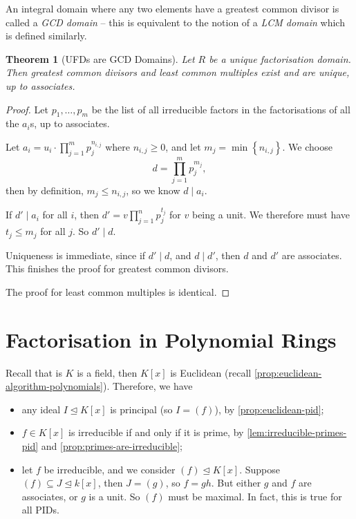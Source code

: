 \documentclass{article}
\newtheorem{theorem}{Theorem}[section]
\theoremstyle{definition}
\theoremstyle{remark}
\newcommand{\pqty}[1]{\left(#1\right)}
\newcommand{\bqty}[1]{\left[#1\right]}
\newcommand{\Bqty}[1]{\left\{#1\right\}}
\newcommand{\idealsub}{\trianglelefteq}
\newcommand{\divides}{\mid}
\begin{document}
An integral domain where any two elements have a greatest common divisor is called a \emph{GCD domain} -- this is equivalent to the notion of a \emph{LCM domain} which is defined similarly.

\begin{theorem}[UFDs are GCD Domains]
    \label{thm:ufd-gcd}%
    Let \(R\) be a unique factorisation domain. Then greatest common divisors and least common multiples exist and are unique, up to associates.    
\end{theorem}

\begin{proof}
    Let \(p_1, \ldots, p_m\) be the list of all irreducible factors in the factorisations of all the \(a_i\)s, up to associates.

    Let \(a_i = u_i \cdot \prod_{j = 1}^{m} p_j^{n_{i, j}}\) where \(n_{i, j} \geq 0\), and let \(m_j = \min \Bqty{n_{i, j}}\). We choose
    \[
        d = \prod_{j = 1}^{m} p_j^{m_j},
    \]
    then by definition, \(m_j \leq n_{i, j}\), so we know \(d \divides a_i\).

    If \(d' \divides a_i\) for all \(i\), then \(d' = v \prod_{j = 1}^{n} p_j^{t_j}\) for \(v\) being a unit. We therefore must have \(t_j \leq m_j\) for all \(j\). So \(d' \divides d\).

    Uniqueness is immediate, since if \(d' \divides d\), and \(d \divides d'\), then \(d\) and \(d'\) are associates. This finishes the proof for greatest common divisors.

    The proof for least common multiples is identical.
\end{proof}

\section{Factorisation in Polynomial Rings}

Recall that is \(K\) is a field, then \(K\bqty{x}\) is Euclidean (recall \autoref{prop:euclidean-algorithm-polynomials}). Therefore, we have
\begin{itemize}
    \item any ideal \(I \idealsub K\bqty{x}\) is principal (so \(I = \pqty{f}\)), by \autoref{prop:euclidean-pid};
    \item \(f \in K\bqty{x}\) is irreducible if and only if it is prime, by \autoref{lem:irreducible-primes-pid} and \autoref{prop:primes-are-irreducible};
    \item let \(f\) be irreducible, and we consider \(\pqty{f} \idealsub K\bqty{x}\). Suppose \(\pqty{f} \subseteq J \idealsub k\bqty{x}\), then \(J = \pqty{g}\), so \(f = gh\). But either \(g\) and \(f\) are associates, or \(g\) is a unit. So \(\pqty{f}\) must be maximal. In fact, this is true for all PIDs.
\end{itemize}
\end{document}
